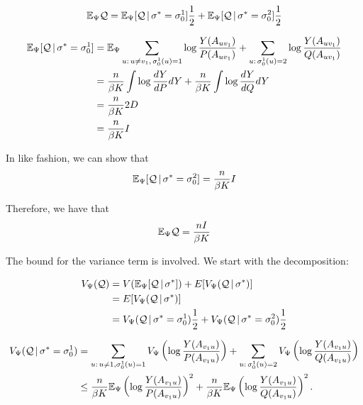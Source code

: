 \documentclass{article}
\begin{document}
\[
{\mathbb E}_{\Psi} \mathcal{Q} = {\mathbb E}_{\Psi} [ \mathcal{Q} {\,|\,} \sigma^* = \sigma_0^1 ] \frac{1}{2} + 
              {\mathbb E}_{\Psi} [ \mathcal{Q} {\,|\,} \sigma^* = \sigma_0^2 ] \frac{1}{2} 
\]

\begin{align*}
{\mathbb E}_{\Psi} [\mathcal{Q} {\,|\,} \sigma^* = \sigma_0^1] &= {\mathbb E}_{\Psi}  \sum_{u: \, u \neq v_1,\, \sigma_0^1(u) = 1} \log \frac{Y(A_{uv_1})}{P(A_{uv_1})} + \sum_{u :\, \sigma_0^1(u) = 2} \log \frac{Y(A_{uv_1})}{Q(A_{uv_1})}  \\
     &= \frac{n}{\beta K}  \int \log \frac{dY}{dP} dY + \frac{n}{\beta K} \int \log \frac{dY}{dQ} dY \\
     &= \frac{n}{\beta K} 2 D\\
     &= \frac{n}{\beta K} I \\
\end{align*}

In like fashion, we can show that
\[
{\mathbb E}_{\Psi}[ \mathcal{Q} {\,|\,} \sigma^* = \sigma_0^2] = \frac{n}{\beta K} I
\]

Therefore, we have that
\begin{align}
{\mathbb E}_{\Psi} \mathcal{Q} = \frac{n I}{\beta K} \label{eqn:expectation_psi_Q_equality}
\end{align}


The bound for the variance term is involved. We start with the decomposition:

\begin{align*}
V_{\Psi}(\mathcal{Q}) &= V( {\mathbb E}_{\Psi}[ \mathcal{Q} {\,|\,} \sigma^* ] ) + 
              E[ V_{\Psi}( \mathcal{Q} {\,|\,} \sigma^* ) ] \\
      &=   E[ V_{\Psi}( \mathcal{Q} {\,|\,} \sigma^* ) ] \\
      &=  V_{\Psi}( \mathcal{Q} {\,|\,} \sigma^* = \sigma_0^1) \frac{1}{2} + 
          V_{\Psi}( \mathcal{Q} {\,|\,} \sigma^* = \sigma_0^2) \frac{1}{2}
\end{align*}


\begin{align*}
V_{\Psi}(\mathcal{Q} {\,|\,} \sigma^* = \sigma_0^1) &= \sum_{u:\, u \neq 1, \sigma_0^1(u) = 1 } 
         V_{\Psi} \left( \log \frac{Y(A_{v_1 u})}{P(A_{v_1 u})} \right) +
                        \sum_{u :\, \sigma_0^1(u) = 2} V_{\Psi} \left( \log \frac{Y(A_{v_1 u})}{Q(A_{v_1 u})} \right)  \\
   &\leq \frac{n}{\beta K}  {\mathbb E}_{\Psi} \left( \log \frac{Y(A_{v_1 u})}{P(A_{v_1 u})} \right)^2 + 
         \frac{n}{\beta K} {\mathbb E}_{\Psi} \left( \log \frac{Y(A_{v_1 u})}{Q(A_{v_1 u})} \right)^2. 
\end{align*}
\end{document}
